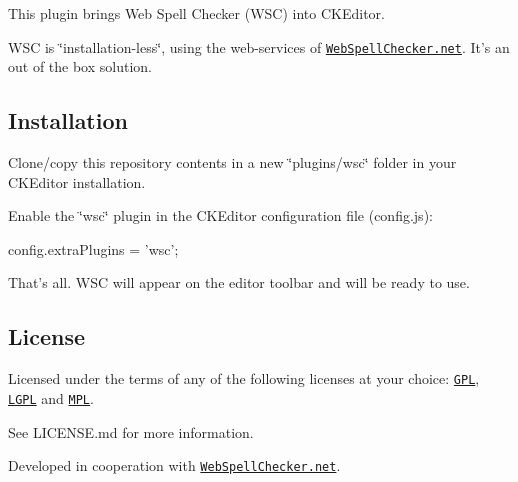 This plugin brings Web Spell Checker (W\-S\-C) into C\-K\-Editor.

W\-S\-C is \char`\"{}installation-\/less\char`\"{}, using the web-\/services of \href{http://www.webspellchecker.net/}{\tt Web\-Spell\-Checker.\-net}. It's an out of the box solution.

\subsection*{Installation }


\begin{DoxyEnumerate}
\item Clone/copy this repository contents in a new \char`\"{}plugins/wsc\char`\"{} folder in your C\-K\-Editor installation.
\item Enable the \char`\"{}wsc\char`\"{} plugin in the C\-K\-Editor configuration file (config.\-js)\-: \begin{DoxyVerb} config.extraPlugins = 'wsc';
\end{DoxyVerb}

\end{DoxyEnumerate}

That's all. W\-S\-C will appear on the editor toolbar and will be ready to use.

\subsection*{License }

Licensed under the terms of any of the following licenses at your choice\-: \href{http://www.gnu.org/licenses/gpl.html}{\tt G\-P\-L}, \href{http://www.gnu.org/licenses/lgpl.html}{\tt L\-G\-P\-L} and \href{http://www.mozilla.org/MPL/MPL-1.1.html}{\tt M\-P\-L}.

See L\-I\-C\-E\-N\-S\-E.\-md for more information.

Developed in cooperation with \href{http://www.webspellchecker.net/}{\tt Web\-Spell\-Checker.\-net}. 